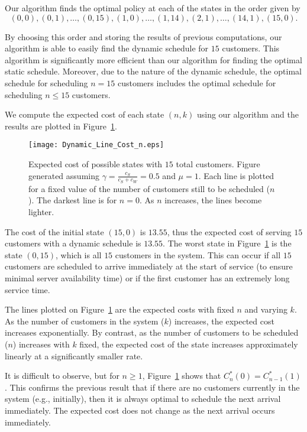 Our algorithm finds the optimal policy at each of the states in the order given by
\begin{equation}
	(0, 0), (0, 1), \ldots, (0, 15), (1, 0), \ldots, (1, 14), (2, 1), \ldots, (14, 1), (15, 0).
\end{equation}

By choosing this order and storing the results of previous computations, our algorithm is able to easily find the dynamic schedule for $15$ customers. This algorithm is significantly more efficient than our algorithm for finding the optimal static schedule. Moreover, due to the nature of the dynamic schedule, the optimal schedule for scheduling $n = 15$ customers includes the optimal schedule for scheduling $n \leq 15$ customers.

We compute the expected cost of each state $(n, k)$ using our algorithm and the results are plotted in Figure~\ref{fig:Dynamic_Cost_15}.
\begin{figure}[htb]
	\centering
	\texttt{[image: Dynamic\_Line\_Cost\_n.eps]}
	\caption{Expected cost of possible states with $15$ total customers. Figure generated assuming $\gamma = \frac{c_{S}}{c_{S} + c_{W}} = 0.5$ and $\mu = 1$. Each line is plotted for a fixed value of the number of customers still to be scheduled ($n$). The darkest line is for $n = 0$. As $n$ increases, the lines become lighter.}
	\label{fig:Dynamic_Cost_15}
\end{figure}

The cost of the initial state $(15, 0)$ is $13.55$, thus the expected cost of serving $15$ customers with a dynamic schedule is $13.55$. The worst state in Figure~\ref{fig:Dynamic_Cost_15} is the state $(0, 15)$, which is all $15$ customers in the system. This can occur if all $15$ customers are scheduled to arrive immediately at the start of service (to ensure minimal server availability time) or if the first customer has an extremely long service time.

The lines plotted on Figure~\ref{fig:Dynamic_Cost_15} are the expected costs with fixed $n$ and varying $k$. As the number of customers in the system ($k$) increases, the expected cost increases exponentially. By contrast, as the number of customers to be scheduled ($n$) increases with $k$ fixed, the expected cost of the state increases approximately linearly at a significantly smaller rate.

It is difficult to observe, but for $n \geq 1$, Figure~\ref{fig:Dynamic_Cost_15} shows that $C_{n}^{*} (0) = C_{n - 1}^{*} (1)$. This confirms the previous result that if there are no customers currently in the system (e.g., initially), then it is always optimal to schedule the next arrival immediately. The expected cost does not change as the next arrival occurs immediately.

